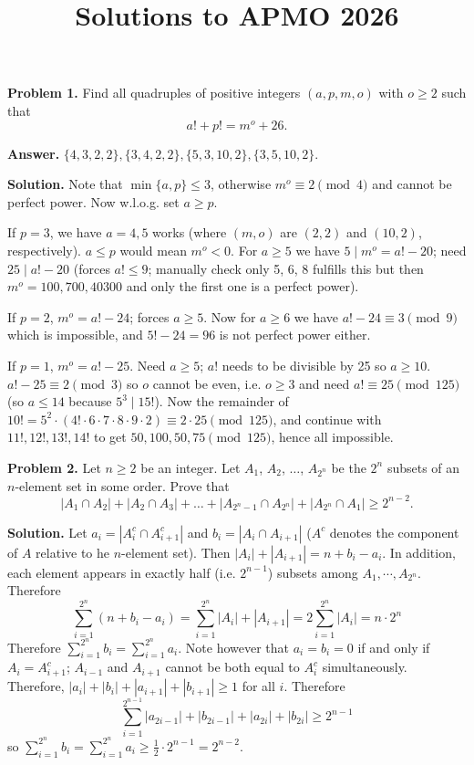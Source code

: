 \documentclass[11pt,a4paper]{article}
\title{Solutions to APMO 2026}
\date{}
\begin{document}
	\newcommand{\la}{\leftarrow}
	\newcommand{\lra}{\leftrightarrow}
	\newcommand{\bbN}{\mathbb{N}}
	\newcommand{\bbZ}{\mathbb{Z}}
	\newcommand{\dsum}{\displaystyle\sum}
	\newcommand{\dprod}{\displaystyle\prod}
	\maketitle
	
	\textbf{Problem 1.} 
	Find all quadruples of positive integers $(a, p, m, o)$ with $o\geq 2$ such that
	\[
	a!+p!=m^o+26.
	\]
	
	\textbf{Answer.} $\{4,3,2,2\}, \{3, 4, 2, 2\}, \{5, 3, 10, 2\}, \{3, 5, 10, 2\}$. 
	
	\textbf{Solution.}
	Note that $\min \{a, p\}\le 3$, otherwise $m^o\equiv 2\pmod{4}$ and cannot be perfect power. 
	Now w.l.o.g. set $a\ge p$. 
	
	If $p = 3$, we have $a = 4, 5$ works (where $(m, o)$ are $(2, 2)$ and $(10, 2)$, respectively). 
	$a \le p$ would mean $m^o < 0$. 
	For $a\ge 5$ we have $5\mid m^o = a!-20$; 
	need $25\mid a! - 20$ (forces $a!\le 9$; manually check only 5, 6, 8 fulfills this but then $m^o=100, 700, 40300$ and only 
	the first one is a perfect power). 
	
	If $p = 2$, $m^o=a!-24$; 
	forces $a\ge 5$. Now for $a\ge 6$ we have $a!-24\equiv 3\pmod{9}$ which is impossible, 
	and $5!-24=96$ is not perfect power either. 
	
	If $p = 1$, $m^o=a!-25$. 
	Need $a\ge 5$; $a!$ needs to be divisible by 25 so $a\ge 10$. 
	$a!-25\equiv 2\pmod{3}$ so $o$ cannot be even, i.e. $o\ge 3$ and need $a!\equiv 25\pmod{125}$
	(so $a\le 14$ because $5^3\mid 15!$). 
	Now the remainder of $10!=5^2\cdot (4! \cdot 6\cdot 7\cdot 8 \cdot 9\cdot 2)\equiv 2\cdot 25\pmod{125}$, 
	and continue with $11!, 12!, 13!, 14!$ to get 
	$50, 100, 50, 75\pmod{125}$, hence all impossible. 
	
	\textbf{Problem 2.}
	Let $n\geq 2$ be an integer. Let $A_1$, $A_2$, $\dots$, $A_{2^n}$ be the $2^n$ subsets of an $n$-element set in some order. Prove that
	\[
	|A_1\cap A_2|+|A_2\cap A_3|+\dots+|A_{2^n-1}\cap A_{2^n}|+|A_{2^n}\cap A_1|\geq 2^{n-2}.
	\]
	
	\textbf{Solution.}
	Let $a_i = |A_i^c \cap A_{i+1}^c|$ and $b_i=|A_i\cap A_{i+1}|$ ($A^c$ denotes the component of $A$ relative to he $n$-element set). 
	Then $|A_i|+|A_{i+1}| = n + b_i - a_i$. 
	In addition, each element appears in exactly half (i.e. $2^{n-1}$) subsets among $A_1, \cdots, A_{2^n}$. 
	Therefore 
	\[
	\sum_{i=1}^{2^n} (n + b_i - a_i)
	= \sum_{i=1}^{2^n} |A_i|+|A_{i+1}|
	= 2\sum_{i=1}^{2^n} |A_i|
	= n\cdot 2^n
	\]
	Therefore $\sum_{i=1}^{2^n}b_i = \sum_{i=1}^{2^n} a_i$. 
	Note however that $a_i=b_i=0$ if and only if $A_i=A_{i+1}^c$; $A_{i-1}$ and $A_{i+1}$ cannot be both equal to $A_i^c$ simultaneously. 
	Therefore, $|a_i|+|b_i|+|a_{i+1}|+|b_{i+1}|\ge 1$ for all $i$. 
	Therefore 
	\[
	\sum_{i=1}^{2^{n-1}} |a_{2i-1}|+|b_{2i-1}|+|a_{2i}|+|b_{2i}| \ge 2^{n-1}
	\]
	so $\sum_{i=1}^{2^n}b_i = \sum_{i=1}^{2^n}a_i\ge \frac 12\cdot 2^{n-1} = 2^{n-2}$. 
	
\end{document}
